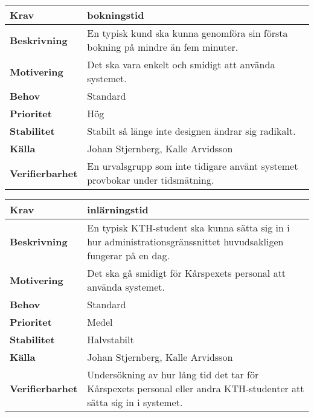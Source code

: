 \documentclass[a4paper, twoside, 11pt, titlepage]{article}
\begin{document}
		\begin{tabular} { | p{3cm} | p{12.2cm} | }
			\hline
			\textbf{Krav} & bokningstid  \\
			\hline
			\textbf{Beskrivning} & En typisk kund ska kunna genomföra sin första bokning på mindre än fem minuter.  \\
			\hline
			\textbf{Motivering} & Det ska vara enkelt och smidigt att använda systemet.  \\
			\hline
			\textbf{Behov} & Standard  \\
			\hline
			\textbf{Prioritet} & Hög  \\
			\hline
			\textbf{Stabilitet} & Stabilt så länge inte designen ändrar sig radikalt.  \\
			\hline
			\textbf{Källa} & Johan Stjernberg, Kalle Arvidsson  \\
			\hline
			\textbf{Verifierbarhet} & En urvalsgrupp som inte tidigare använt systemet provbokar under tidsmätning.  \\
			\hline
		\end{tabular}

		\begin{tabular} { | p{3cm} | p{12.2cm} | }
			\hline
			\textbf{Krav} & inlärningstid  \\
			\hline
			\textbf{Beskrivning} & En typisk KTH-student ska kunna sätta sig in i hur administrationsgränssnittet huvudsakligen fungerar på en dag.  \\
			\hline
			\textbf{Motivering} & Det ska gå smidigt för Kårspexets personal att använda systemet.  \\
			\hline
			\textbf{Behov} & Standard  \\
			\hline
			\textbf{Prioritet} & Medel  \\
			\hline
			\textbf{Stabilitet} & Halvstabilt  \\
			\hline
			\textbf{Källa} & Johan Stjernberg, Kalle Arvidsson  \\
			\hline
			\textbf{Verifierbarhet} & Undersökning av hur lång tid det tar för Kårspexets personal eller andra KTH-studenter att sätta sig in i systemet.  \\
			\hline
		\end{tabular}
\end{document}

